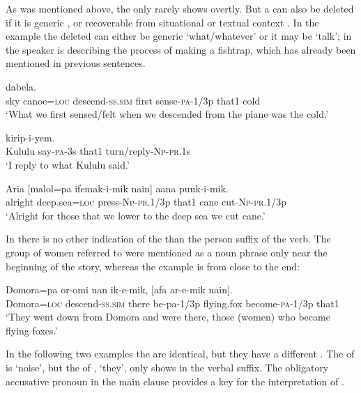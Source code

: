 As was mentioned above, the  only rarely shows overtly. But a  can also be deleted if it is generic , or recoverable from situational  or textual context . In the example  the deleted  can either be generic `what/whatever' or it may be  `talk'; in  the speaker is describing the process of making a fishtrap, which has already been mentioned in previous sentences.

\ea%
\label{ex:8:x1561}
\gll [Iinan  aasa=pa  or-omi  kiikir  furew-a-mik  nain]  dabela.  \\
sky  canoe=\textsc{loc} descend-\textsc{ss}.\textsc{sim} first  sense-\textsc{pa}-1/3p that1 cold\\
\glt`What we first sensed/felt when we descended from the plane was the cold.'
\z


\ea%
\label{ex:8:x1555}
  kirip-i-yem. \\
Kululu  say-\textsc{pa}-3s that1 turn/reply-\textsc{Np}-\textsc{pr}.1s\\
\glt`I reply to what Kululu said.'
\z


\ea%
\label{ex:8:x1559}
\gll Aria  [malol=pa  ifemak-i-mik  nain]  aana puuk-i-mik.\\
alright  deep.sea=\textsc{loc} press-\textsc{Np}-\textsc{pr}.1/3p  that1 cane cut-\textsc{Np}-\textsc{pr}.1/3p\\
\glt`Alright for those that we lower to the deep sea we cut cane.'
\z


In  there is no other indication of the   than the person suffix of the verb. The group of women referred to were mentioned as a noun phrase only near the beginning of the story, whereas the example is from close to the end:

\ea%
\label{ex:8:x1556}
\gll Domora=pa  or-omi  nan  ik-e-mik,  [afa ar-e-mik  nain]. \\
Domora=\textsc{loc} descend-\textsc{ss}.\textsc{sim} there be-pa-1/3p  flying.fox become-\textsc{pa}-1/3p  that1\\
\glt`They went down from Domora and were there, those (women) who became flying foxes.'
\z


In the following two examples the  are identical, but they have a different . The  of  is  `noise', but the  of ,  `they', only shows in the verbal suffix. The obligatory accusative pronoun in the main clause provides a key for the interpretation of .

